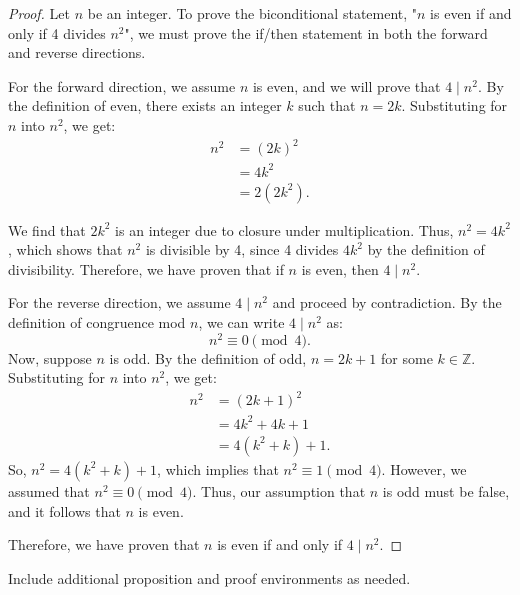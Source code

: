 \documentclass[12pt]{article}
\theoremstyle{definition}
\begin{document}
\begin{proof}
    Let \( n \) be an integer. To prove the biconditional statement, "\( n \) is even if and only if 4 divides \( n^2 \)", we must prove the if/then statement in both the forward and reverse directions.

    \vspace{1em}

    For the forward direction, we assume \( n \) is even, and we will prove that \( 4 \mid n^2 \). By the definition of even, there exists an integer \( k \) such that \( n = 2k \). Substituting for \( n \) into \( n^2 \), we get:
    \begin{align*}
        n^2 &= (2k)^2 \\
             &= 4k^2 \\
             &= 2(2k^2).
    \end{align*}

    We find that \( 2k^2 \) is an integer due to closure under multiplication. Thus, \( n^2 = 4k^2 \), which shows that \( n^2 \) is divisible by 4, since 4 divides \( 4k^2 \) by the definition of divisibility. Therefore, we have proven that if \( n \) is even, then \( 4 \mid n^2 \).

    \vspace{1em}
    For the reverse direction, we assume \( 4 \mid n^2 \) and proceed by contradiction. By the definition of congruence mod \( n \), we can write \( 4 \mid n^2 \) as:
    \[
    n^2 \equiv 0 \pmod{4}.
    \]
    Now, suppose \( n \) is odd. By the definition of odd, \( n = 2k + 1 \) for some \( k \in \mathbb{Z} \). Substituting for \( n \) into \( n^2 \), we get:
    \begin{align*}
        n^2 &= (2k + 1)^2 \\
             &= 4k^2 + 4k + 1 \\
             &= 4(k^2 + k) + 1.
    \end{align*}
    So, \( n^2 = 4(k^2 + k) + 1 \), which implies that \( n^2 \equiv 1 \pmod{4} \). However, we assumed that \( n^2 \equiv 0 \pmod{4} \). Thus, our assumption that \( n \) is odd must be false, and it follows that \( n \) is even.

    \vspace{1em}
    
    Therefore, we have proven that \( n \) is even if and only if \( 4 \mid n^2 \).
\end{proof}

\noindent Include additional proposition and proof environments as needed.
\end{document}
